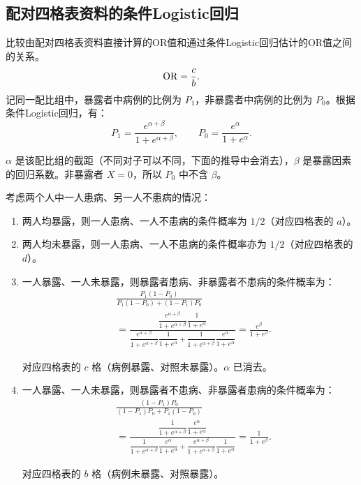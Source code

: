 \subsection{配对四格表资料的条件Logistic回归}
比较由配对四格表资料直接计算的OR值和通过条件Logistic回归估计的OR值之间的关系。
\[
\operatorname{OR}=\frac cb.
\]
记同一配比组中，暴露者中病例的比例为 $P_1$，非暴露者中病例的比例为 $P_0$。根据条件Logistic回归，有：
\[
P_1=\frac{e^{\alpha+\beta}}{1+e^{\alpha+\beta}},\qquad
P_0=\frac{e^\alpha}{1+e^\alpha}.
\]
\begin{annotation}$\alpha$ 是该配比组的截距（不同对子可以不同，下面的推导中会消去），$\beta$ 是暴露因素的回归系数。非暴露者 $X=0$，所以 $P_0$ 中不含 $\beta$。\end{annotation}
考虑两个人中一人患病、另一人不患病的情况：
\begin{enumerate}
\item 两人均暴露，则一人患病、一人不患病的条件概率为 $1/2$（对应四格表的 $a$）。
\item 两人均未暴露，则一人患病、一人不患病的条件概率亦为 $1/2$（对应四格表的 $d$）。
\item 一人暴露、一人未暴露，则暴露者患病、非暴露者不患病的条件概率为：
\begin{align*}
&\frac{P_1(1-P_0)}{P_1(1-P_0)+(1-P_1)P_0}\\
&=\frac{\dfrac{e^{\alpha+\beta}}{1+e^{\alpha+\beta}}\dfrac1{1+e^\alpha}}
 {\dfrac{e^{\alpha+\beta}}{1+e^{\alpha+\beta}}\dfrac1{1+e^\alpha}+\dfrac1{1+e^{\alpha+\beta}}\dfrac{e^\alpha}{1+e^\alpha}}
=\frac{e^\beta}{1+e^\beta}.
\end{align*}
\begin{annotation}对应四格表的 $c$ 格（病例暴露、对照未暴露）。$\alpha$ 已消去。\end{annotation}
\item 一人暴露、一人未暴露，则暴露者不患病、非暴露者患病的条件概率为：
\begin{align*}
&\frac{(1-P_1)P_0}{(1-P_1)P_0+P_1(1-P_0)}\\
&=\frac{\dfrac1{1+e^{\alpha+\beta}}\dfrac{e^\alpha}{1+e^\alpha}}
 {\dfrac1{1+e^{\alpha+\beta}}\dfrac{e^\alpha}{1+e^\alpha}+\dfrac{e^{\alpha+\beta}}{1+e^{\alpha+\beta}}\dfrac1{1+e^\alpha}}
=\frac1{1+e^\beta}.
\end{align*}
\begin{annotation}对应四格表的 $b$ 格（病例未暴露、对照暴露）。\end{annotation}
\end{enumerate}

